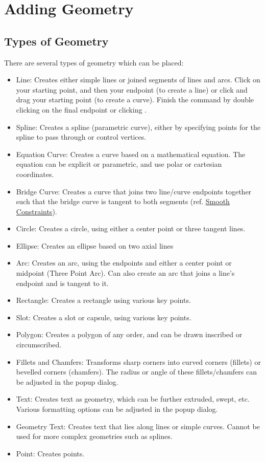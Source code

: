 \section{Adding Geometry}

\subsection{Types of Geometry}

There are several types of geometry which can be placed:

\begin{itemize}
\item Line: Creates either simple lines or joined segments of lines and arcs. Click on your starting point, and then your endpoint (to create a line) or click and drag your starting point (to create a curve). Finish the command by double clicking on the final endpoint or clicking .
\item Spline: Creates a spline (parametric curve), either by specifying points for the spline to pass through or control vertices. 
\item Equation Curve: Creates a curve based on a mathematical equation. The equation can be explicit or parametric, and use polar or cartesian coordinates.
\item Bridge Curve: Creates a curve that joins two line/curve endpoints together such that the bridge curve is tangent to both segments (ref. \hyperref[subchap:constraint-types]{Smooth Constraints}).
\item Circle: Creates a circle, using either a center point or three tangent lines.
\item Ellipse: Creates an ellipse based on two axial lines
\item Arc: Creates an arc, using the endpoints and either a center point or midpoint (Three Point Arc). Can also create an arc that joins a line's endpoint and is tangent to it.
\item Rectangle: Creates a rectangle using various key points.
\item Slot: Creates a slot or capsule, using various key points.
\item Polygon: Creates a polygon of any order, and can be drawn inscribed or circumscribed.
\item Fillets and Chamfers: Transforms sharp corners into curved corners (fillets) or bevelled corners (chamfers). The radius or angle of these fillets/chamfers can be adjusted in the popup dialog.
\item Text: Creates text as geometry, which can be further extruded, swept, etc. Various formatting options can be adjusted in the popup dialog.
\item Geometry Text: Creates text that lies along lines or simple curves. Cannot be used for more complex geometries such as splines.
\item Point: Creates points.

\end{itemize}

